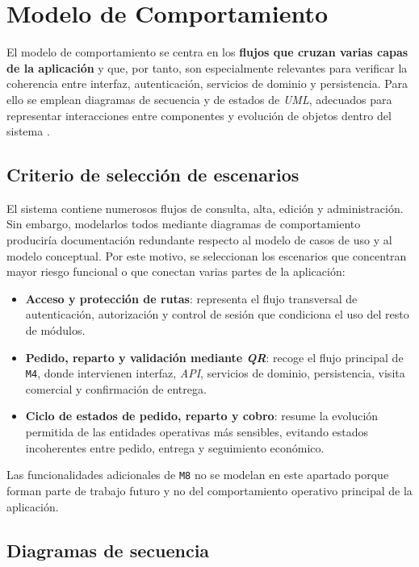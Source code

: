 \section{Modelo de Comportamiento}
\label{sec:behaviorModel}

El modelo de comportamiento se centra en los \textbf{flujos que cruzan varias capas de la aplicación} y que, por tanto, son especialmente relevantes para verificar la coherencia entre interfaz, autenticación, servicios de dominio y persistencia. Para ello se emplean diagramas de secuencia y de estados de \textit{UML}, adecuados para representar interacciones entre componentes y evolución de objetos dentro del sistema \citep[Ch.~5]{sommerville}.

\subsection{Criterio de selección de escenarios}

El sistema contiene numerosos flujos de consulta, alta, edición y administración. Sin embargo, modelarlos todos mediante diagramas de comportamiento produciría documentación redundante respecto al modelo de casos de uso y al modelo conceptual. Por este motivo, se seleccionan los escenarios que concentran mayor riesgo funcional o que conectan varias partes de la aplicación:

\begin{itemize}
    \item \textbf{Acceso y protección de rutas}: representa el flujo transversal de autenticación, autorización y control de sesión que condiciona el uso del resto de módulos.
    \item \textbf{Pedido, reparto y validación mediante \textit{QR}}: recoge el flujo principal de \texttt{M4}, donde intervienen interfaz, \textit{API}, servicios de dominio, persistencia, visita comercial y confirmación de entrega.
    \item \textbf{Ciclo de estados de pedido, reparto y cobro}: resume la evolución permitida de las entidades operativas más sensibles, evitando estados incoherentes entre pedido, entrega y seguimiento económico.
\end{itemize}

Las funcionalidades adicionales de \texttt{M8} no se modelan en este apartado porque forman parte de trabajo futuro y no del comportamiento operativo principal de la aplicación.

\subsection{Diagramas de secuencia}

